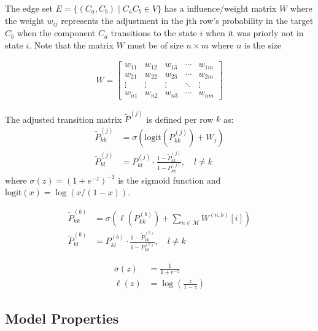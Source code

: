\documentclass[answers,12pt,addpoints]{exam}
\begin{document}
The edge set $E = \{(C_a, C_b) \mid C_a C_b \in V\}$ has a influence/weight matrix $W$ where the weight $w_{ij}$ represents the adjustment in the jth row's probability in the target $C_b$ when the component $C_a$ transitions to the state $i$ when it was priorly not in state $i$. Note that the matrix $W$ must be of size $n \times m$ where $n$ is the size 

\begin{align*}
    W = \begin{bmatrix}
    w_{11} & w_{12} & w_{13} & \cdots & w_{1m} \\
    w_{21} & w_{22} & w_{23} & \cdots & w_{2m} \\
    \vdots & \vdots & \vdots & \ddots & \vdots \\
    w_{n1} & w_{n2} & w_{n3} & \cdots & w_{nm}
    \end{bmatrix}
\end{align*}

The adjusted transition matrix $\widetilde{P}^{(j)}$ is defined per row $k$ as:
\begin{align*}
\widetilde{P}^{(j)}_{kk} &= \sigma\left( \mathrm{logit}\left(P^{(j)}_{kk}\right) + W_j \right) \\
\widetilde{P}^{(j)}_{kl} &= P^{(j)}_{kl} \cdot \frac{1 - \widetilde{P}^{(j)}_{kk}}{1 - P^{(j)}_{kk}}, \quad l \neq k
\end{align*}
where $\sigma(z) = (1 + e^{-z})^{-1}$ is the sigmoid function and $\mathrm{logit}(x) = \log(x/(1-x))$.


\begin{align*}
    \tilde{P}_{kk}^{(b)} &= \sigma \left( \ell (P^{(b)}_{kk}) + \sum_{n \in \mathcal{M}} W^{(n,b)}[i] \right) \\
    \tilde{P}_{kl}^{(b)} &= P^{(b)}_{kl} \cdot \frac{1 - \tilde{P}_{kk}^{(b)}}{1 - P^{(b)}_{kk}}, \quad l \neq k
\end{align*}

\begin{align*}
    \sigma(z) &= \frac{1}{1 + e^{-z}} \\
    \ell(z) &= \log\left(\frac{z}{1-z}\right)
\end{align*}

\subsection*{Model Properties}
\end{document}
